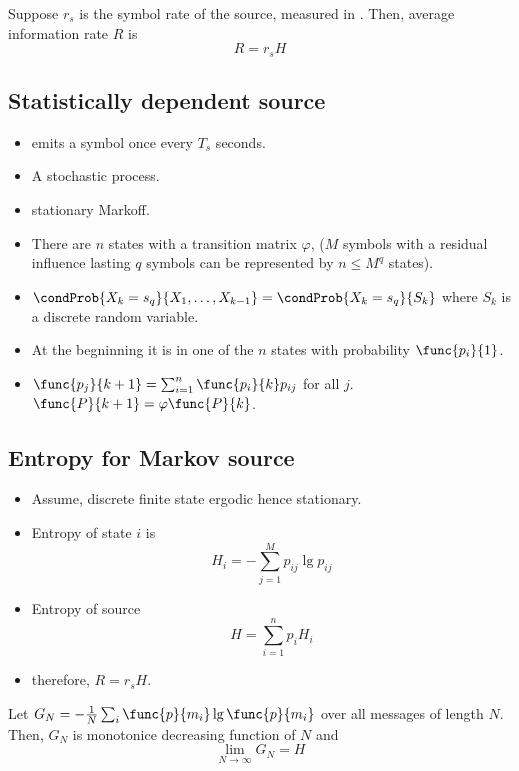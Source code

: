 Suppose \(r_s\) is the symbol rate of the source, measured in \(\). Then, average information rate \(R\) is 
\begin{equation*}
    R = r_sH 
\end{equation*}

\subsection{Statistically dependent source}
\begin{itemize}
    \item emits a symbol once every \(T_s\) seconds.
    \item A stochastic process.
    \item stationary Markoff.
    \item There are \(n\) states with a transition matrix \(\varphi\), (\(M\) symbols with a residual influence lasting \(q\) symbols can be represented by \(n \leq M^q\) states).
    \item \(\condProb{X_k = s_q}{X_1, \dots , X_{k-1}} = \condProb{X_k = s_q}{S_k}\) where \(S_k\) is a discrete random variable. 
    \item At the begninning it is in one of the \(n\) states with probability \(\func{p_i}{1}\).
    \item \(\func{p_j}{k+ 1} = \sum_{i = 1}^n \func{p_i}{k} p_{ij}\) for all \(j\). \(\func{P}{k + 1} = \varphi \func{P}{k}\).
\end{itemize}
\subsection{Entropy for Markov source}
\begin{itemize}
    \item Assume, discrete finite state ergodic hence stationary.
    \item Entropy of state \(i\) is
    \begin{equation*}
        H_i = - \sum_{j = 1}^M p_{ij} \lg p_{ij}
    \end{equation*} 
    \item Entropy of source 
    \begin{equation*}
        H = \sum_{ i = 1}^n p_i H_i
    \end{equation*}
    \item therefore, \(R = r_sH\).
\end{itemize}
\begin{theorem}
    Let \(G_N = - \frac{1}{N} \sum_i \func{p}{m_i} \lg \func{p}{m_i}\) over all messages of length \(N\). Then, \(G_N\) is monotonice decreasing function of \(N\) and 
    \begin{equation*}
        \lim_{N \to \infty} G_N = H
    \end{equation*}
\end{theorem}
